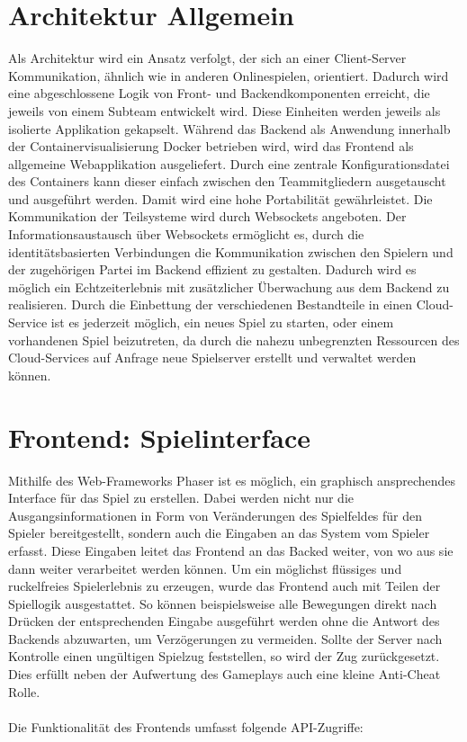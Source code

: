 \documentclass[conference]{IEEEtran}
\begin{document}
\section{Architektur Allgemein}
Als Architektur wird ein Ansatz verfolgt, der sich an einer Client-Server Kommunikation, ähnlich wie in anderen Onlinespielen, orientiert.
Dadurch wird eine abgeschlossene Logik von Front- und Backendkomponenten erreicht, die jeweils
von einem Subteam entwickelt wird. Diese Einheiten werden jeweils als isolierte Applikation gekapselt. Während das Backend als Anwendung innerhalb der Containervisualisierung Docker betrieben wird, wird das Frontend als allgemeine Webapplikation ausgeliefert. Durch eine zentrale Konfigurationsdatei des Containers kann dieser einfach zwischen den Teammitgliedern ausgetauscht und ausgeführt werden. Damit wird eine hohe Portabilität gewährleistet.
Die Kommunikation der Teilsysteme wird durch Websockets angeboten. Der Informationsaustausch über Websockets ermöglicht es, durch die identitätsbasierten Verbindungen die Kommunikation zwischen den Spielern und der zugehörigen Partei im Backend effizient zu gestalten.
Dadurch wird es möglich ein Echtzeiterlebnis mit zusätzlicher Überwachung aus dem Backend zu realisieren.
Durch die Einbettung der verschiedenen Bestandteile in einen Cloud-Service ist es jederzeit möglich, ein neues Spiel zu starten, oder einem vorhandenen Spiel beizutreten, da durch die nahezu unbegrenzten Ressourcen des Cloud-Services auf Anfrage neue Spielserver erstellt und verwaltet werden können.

\section{Frontend: Spielinterface}
Mithilfe des Web-Frameworks Phaser ist es möglich, ein graphisch ansprechendes Interface für das Spiel zu erstellen. Dabei werden nicht nur die Ausgangsinformationen in Form von Veränderungen des Spielfeldes für den Spieler bereitgestellt, sondern auch die Eingaben an das System vom Spieler erfasst. Diese Eingaben leitet das Frontend an das Backed weiter, von wo aus sie dann weiter verarbeitet werden können. Um ein möglichst flüssiges und ruckelfreies Spielerlebnis zu erzeugen, wurde das Frontend auch mit Teilen der Spiellogik ausgestattet. So können beispielsweise alle Bewegungen direkt nach Drücken der entsprechenden Eingabe ausgeführt werden ohne die Antwort des Backends abzuwarten, um Verzögerungen zu vermeiden. Sollte der Server nach Kontrolle einen ungültigen Spielzug feststellen, so wird der Zug zurückgesetzt. Dies erfüllt neben der Aufwertung des Gameplays auch eine kleine Anti-Cheat Rolle.
\\
\\
Die Funktionalität des Frontends umfasst folgende API-Zugriffe:
\smallskip
\end{document}
